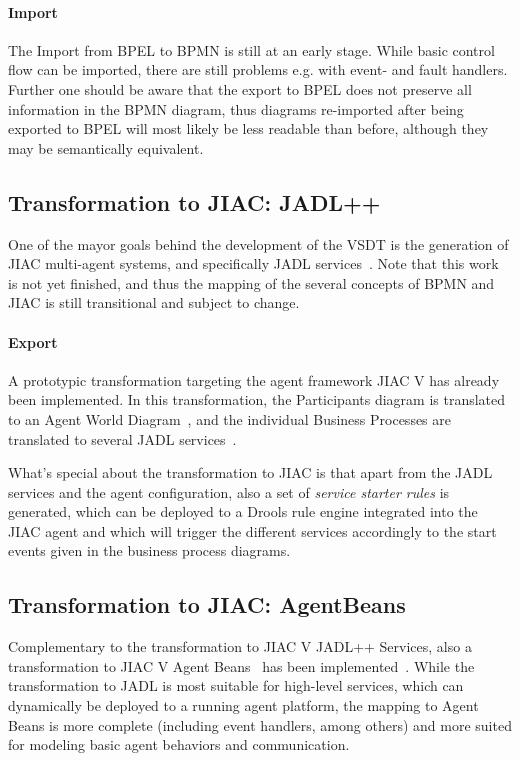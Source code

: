 \paragraph{Import}
The Import from BPEL to BPMN is still at an early stage.  While basic control
flow can be imported, there are still problems e.g. with event- and fault handlers.
Further one should be aware that the export to BPEL does not preserve all
information in the BPMN diagram, thus diagrams re-imported after being exported
to BPEL will most likely be less readable than before, although they may be
semantically equivalent.


\subsection{Transformation to JIAC: JADL++}
\label{sec:user_trafo_jadl}

One of the mayor goals behind the development of the VSDT is the generation of
JIAC multi-agent systems, and specifically JADL services~\cite{kuester2012integrating}.
Note that this work is not yet finished, and thus the mapping of the several
concepts of BPMN and JIAC is still transitional and subject to change.

\paragraph{Export}
A prototypic transformation targeting the agent framework JIAC V has already been
implemented.  In this transformation, the Participants diagram is translated to
an Agent World Diagram~\cite{lutzenberger2009unifying}, and the individual Business
Processes are translated to several JADL services~\cite{hirsch2010programming}.

What's special about the transformation to JIAC is that apart from the JADL
services and the agent configuration, also a set of \emph{service starter rules}
is generated, which can be deployed to a Drools rule engine integrated into the
JIAC agent and which will trigger the different services accordingly to the start
events given in the business process diagrams.


\subsection{Transformation to JIAC: AgentBeans}
\label{sec:user_trafo_agentbeans}

Complementary to the transformation to JIAC V JADL++ Services, also a transformation
to JIAC V Agent Beans~\cite{lutzenberger2013jiacShort} has been implemented~\cite{tan2011dipl}.
While the transformation to JADL is most suitable for high-level services, which
can dynamically be deployed to a running agent platform, the mapping to Agent
Beans is more complete (including event handlers, among others) and more suited
for modeling basic agent behaviors and communication.

